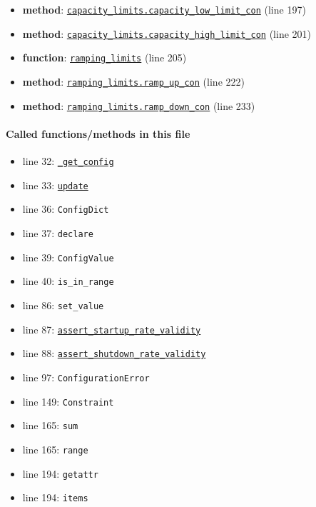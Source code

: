 \documentclass[11pt]{report}
\begin{document}
\begin{itemize}[leftmargin=*]
  \item \textbf{method}: \hyperref[def:pricetaker-unit_commitment.py:capacity_limits.capacity_low_limit_con:L197]{\texttt{capacity\_limits.capacity\_low\_limit\_con}} (line 197)
  \item \textbf{method}: \hyperref[def:pricetaker-unit_commitment.py:capacity_limits.capacity_high_limit_con:L201]{\texttt{capacity\_limits.capacity\_high\_limit\_con}} (line 201)
  \item \textbf{function}: \hyperref[def:pricetaker-unit_commitment.py:ramping_limits:L205]{\texttt{ramping\_limits}} (line 205)
  \item \textbf{method}: \hyperref[def:pricetaker-unit_commitment.py:ramping_limits.ramp_up_con:L222]{\texttt{ramping\_limits.ramp\_up\_con}} (line 222)
  \item \textbf{method}: \hyperref[def:pricetaker-unit_commitment.py:ramping_limits.ramp_down_con:L233]{\texttt{ramping\_limits.ramp\_down\_con}} (line 233)
\end{itemize}
\paragraph{Called functions/methods in this file}
\begin{itemize}[leftmargin=*]
  \item line 32: \hyperref[def:pricetaker-unit_commitment.py:UnitCommitmentData._get_config:L35]{\texttt{\_get\_config}}
  \item line 33: \hyperref[def:pricetaker-unit_commitment.py:UnitCommitmentData.update:L84]{\texttt{update}}
  \item line 36: \texttt{ConfigDict}
  \item line 37: \texttt{declare}
  \item line 39: \texttt{ConfigValue}
  \item line 40: \texttt{is\_in\_range}
  \item line 86: \texttt{set\_value}
  \item line 87: \hyperref[def:pricetaker-unit_commitment.py:UnitCommitmentData.assert_startup_rate_validity:L90]{\texttt{assert\_startup\_rate\_validity}}
  \item line 88: \hyperref[def:pricetaker-unit_commitment.py:UnitCommitmentData.assert_shutdown_rate_validity:L103]{\texttt{assert\_shutdown\_rate\_validity}}
  \item line 97: \texttt{ConfigurationError}
  \item line 149: \texttt{Constraint}
  \item line 165: \texttt{sum}
  \item line 165: \texttt{range}
  \item line 194: \texttt{getattr}
  \item line 194: \texttt{items}
\end{itemize}
\end{document}

